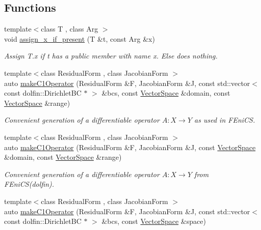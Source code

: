 \subsection*{\-Functions}
\begin{DoxyCompactItemize}
\item 
\hypertarget{namespaceSpacy_1_1FEniCS_a8b026331ea4b807e97cc64cb765e6a73}{{\footnotesize template$<$class T , class Arg $>$ }\\void \hyperlink{namespaceSpacy_1_1FEniCS_a8b026331ea4b807e97cc64cb765e6a73}{assign\-\_\-x\-\_\-if\-\_\-present} (\-T \&t, const \-Arg \&x)}\label{namespaceSpacy_1_1FEniCS_a8b026331ea4b807e97cc64cb765e6a73}

\begin{DoxyCompactList}\small\item\em \-Assign \-T.\-x if t has a public member with name x. \-Else does nothing. \end{DoxyCompactList}\item 
{\footnotesize template$<$class Residual\-Form , class Jacobian\-Form $>$ }\\auto \hyperlink{namespaceSpacy_1_1FEniCS_a5ff124eb62c7d5b69a5ab4aa196a2453}{make\-C1\-Operator} (\-Residual\-Form \&\-F, \-Jacobian\-Form \&\-J, const std\-::vector$<$ const dolfin\-::\-Dirichlet\-B\-C $\ast$ $>$ \&bcs, const \hyperlink{classSpacy_1_1VectorSpace}{\-Vector\-Space} \&domain, const \hyperlink{classSpacy_1_1VectorSpace}{\-Vector\-Space} \&range)
\begin{DoxyCompactList}\small\item\em \-Convenient generation of a differentiable operator $A: X\rightarrow Y$ as used in \-F\-Eni\-C\-S. \end{DoxyCompactList}\item 
{\footnotesize template$<$class Residual\-Form , class Jacobian\-Form $>$ }\\auto \hyperlink{namespaceSpacy_1_1FEniCS_a8b625ee36b2bee78a517d91031572c81}{make\-C1\-Operator} (\-Residual\-Form \&\-F, \-Jacobian\-Form \&\-J, const \hyperlink{classSpacy_1_1VectorSpace}{\-Vector\-Space} \&domain, const \hyperlink{classSpacy_1_1VectorSpace}{\-Vector\-Space} \&range)
\begin{DoxyCompactList}\small\item\em \-Convenient generation of a differentiable operator $A: X\rightarrow Y$ from \-F\-Eni\-C\-S(dolfin). \end{DoxyCompactList}\item 
{\footnotesize template$<$class Residual\-Form , class Jacobian\-Form $>$ }\\auto \hyperlink{namespaceSpacy_1_1FEniCS_ac2ffc6f5956faffe26cc9e0ef59209c3}{make\-C1\-Operator} (\-Residual\-Form \&\-F, \-Jacobian\-Form \&\-J, const std\-::vector$<$ const dolfin\-::\-Dirichlet\-B\-C $\ast$ $>$ \&bcs, const \hyperlink{classSpacy_1_1VectorSpace}{\-Vector\-Space} \&space)

\end{DoxyCompactItemize}
